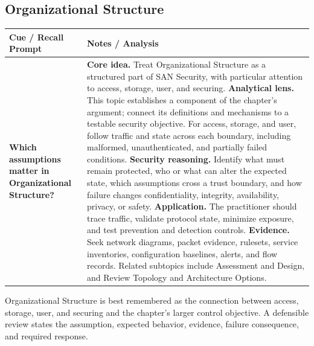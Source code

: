 \documentclass[11pt]{article}
\newcommand{\CornellHeader}{%
\rowcolor{Navy}\color{white}\bfseries Cue / Recall Prompt & \color{white}\bfseries Notes / Analysis\\\hline}
\newcommand{\CornellRow}[2]{%
\cellcolor{CueGray}\RaggedRight\textbf{#1} & \RaggedRight #2\\\hline}
\begin{document}
\subsection*{Organizational Structure}
\begin{longtable}{>{\RaggedRight\arraybackslash}p{}|>{\RaggedRight\arraybackslash}p{}}
\CornellHeader
\CornellRow{Which assumptions matter in Organizational Structure?}{\textbf{Core idea.} Treat Organizational Structure as a structured part of SAN Security, with particular attention to access, storage, user, and securing. \textbf{Analytical lens.} This topic establishes a component of the chapter's argument; connect its definitions and mechanisms to a testable security objective. For access, storage, and user, follow traffic and state across each boundary, including malformed, unauthenticated, and partially failed conditions. \textbf{Security reasoning.} Identify what must remain protected, who or what can alter the expected state, which assumptions cross a trust boundary, and how failure changes confidentiality, integrity, availability, privacy, or safety. \textbf{Application.} The practitioner should trace traffic, validate protocol state, minimize exposure, and test prevention and detection controls. \textbf{Evidence.} Seek network diagrams, packet evidence, rulesets, service inventories, configuration baselines, alerts, and flow records. Related subtopics include Assessment and Design, and Review Topology and Architecture Options.}
\end{longtable}
\begin{topicsummary}
Organizational Structure is best remembered as the connection between access, storage, user, and securing and the chapter's larger control objective. A defensible review states the assumption, expected behavior, evidence, failure consequence, and required response.
\end{topicsummary}
\end{document}
